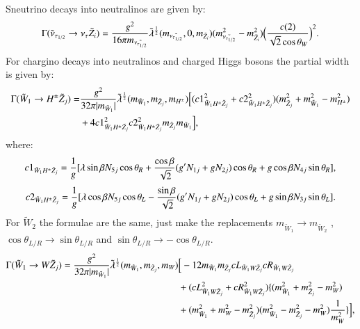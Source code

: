 \documentclass[final,3p,times,pdflatex]{elsarticle}
\begin{document}
Sneutrino decays into neutralinos are given by:
\begin{equation} \label{snutuanutauneutNMSSM}
\Gamma(\tilde{\nu}_{\tau_{1/2}} \rightarrow \nu_{\tau} \tilde{Z}_i) = {g^2 \over 16 \pi m_{\tilde{\nu_{\tau_{1/2}}}}} \tilde{\lambda}^{1 \over 2}(m_{\tilde{\nu_{\tau_{1/2}}}},0, m_{\tilde{Z}_i})(m_{\tilde{\nu_{\tau_{1/2}}}}^2 - m_{\tilde{Z}_i}^2)\Big({c(2) \over \sqrt{2} \cos\theta_W}\Big)^2.
\end{equation}
For chargino decays into neutralinos and charged Higgs bosons the partial width is given by:
\begin{equation} \label{chHpmneutNMSSM}
\begin{aligned}
\Gamma(\tilde{W}_1 \rightarrow H^{\pm} \tilde{Z}_j) = & {g^2 \over 32\pi |m_{\tilde{W}_1}|} \tilde{\lambda}^{1 \over 2}(m_{\tilde{W}_1},m_{\tilde{Z}_j},m_{H^{\pm}})\Big[({c1}_{\tilde{W}_1 H^{\pm} \tilde{Z}_j}^2 + {c2}_{\tilde{W}_1 H^{\pm} \tilde{Z}_j}^2)(m_{\tilde{Z}_j}^2 + m_{\tilde{W}_1}^2 - m_{H^{\pm}}^2) \\ & + 4{c1}_{\tilde{W}_1 H^{\pm} \tilde{Z}_j}^2 {c2}_{\tilde{W}_1 H^{\pm} \tilde{Z}_j}^2 m_{\tilde{Z}_j} m_{\tilde{W}_1}\Big],
\end{aligned}
\end{equation}
where:
\begin{equation}
{c1}_{\tilde{W}_1 H^{\pm} \tilde{Z}_j} = {1 \over g} [\lambda \sin\beta N_{5j} \cos\theta_R + {\cos\beta \over \sqrt{2}}(g' N_{1j} + gN_{2j})\cos\theta_R + g\cos\beta N_{4j} \sin\theta_R],
\end{equation}
\begin{equation}
{c2}_{\tilde{W}_1 H^{\pm} \tilde{Z}_j} = {1 \over g}[\lambda \cos\beta N_{5j} \cos\theta_L - {\sin\beta \over \sqrt{2}}(g' N_{1j} + gN_{2j})\cos\theta_L + g\sin\beta N_{3j}\sin\theta_L].
\end{equation}
For $\tilde{W}_2$ the formulae are the same, just make the replacements $m_{\tilde{W}_1} \rightarrow m_{\tilde{W}_2}$ , $\cos\theta_{L/R} \rightarrow \sin\theta_{L/R}$ and $\sin\theta_{L/R} \rightarrow -\cos\theta_{L/R}$.
\begin{equation} \label{chWneutNMSSM}
\begin{aligned}
\Gamma(\tilde{W}_1 \rightarrow W \tilde{Z}_j) = {g^2 \over 32\pi |m_{\tilde{W}_1}|} \tilde{\lambda}^{1 \over 2}(m_{\tilde{W}_1},m_{\tilde{Z}_j},m_{W}) &\Big[-12 m_{\tilde{W}_1} m_{\tilde{Z}_j} {cL}_{\tilde{W}_1 W \tilde{Z}_j} {cR}_{\tilde{W}_1 W \tilde{Z}_j} \\ & + ({cL}_{\tilde{W}_1 W \tilde{Z}_j}^2 + {cR}_{\tilde{W}_1 W \tilde{Z}_j}^2)	 \{(m_{\tilde{W}_1}^2 + m_{\tilde{Z}_j}^2 - m_{W}^2) \\ & + (m_{\tilde{W}_1}^2 + m_{W}^2 - m_{\tilde{Z}_j}^2)(m_{\tilde{W}_1}^2 - m_{\tilde{Z}_j}^2 - m_{W}^2){1 \over m_{W}^2}\}\Big],
\end{aligned}
\end{equation}
\end{document}
